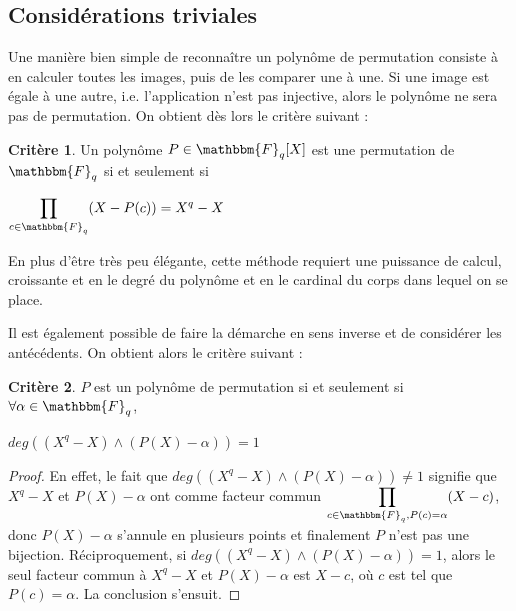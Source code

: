 \documentclass[12pt]{article}
\newcommand{\Fq}{\mathbbm{F}_q}
\theoremstyle{definition}
\newtheorem{crit}{Critère}
\begin{document}
\subsection{Considérations triviales}
Une manière bien simple de reconnaître un polynôme de permutation consiste à en calculer toutes les images, puis de les comparer une à une. Si une image est égale à une autre, i.e. l'application n'est pas injective, alors le polynôme ne sera pas de permutation. On obtient dès lors le critère suivant :
\begin{crit}
Un polynôme $P \in \Fq[X]$ est une permutation de $\Fq$ si et seulement si \begin{center}$\displaystyle\prod_{c \in \Fq}(X-P(c)) = X^q -X$ \end{center}
\end{crit}
En plus d'être très peu élégante, cette méthode requiert une puissance de calcul, croissante et en le degré du polynôme et en le cardinal du corps dans lequel on se place. 

Il est également possible de faire la démarche en sens inverse et de considérer les antécédents. On obtient alors le critère suivant :

\begin{crit}
$P$ est un polynôme de permutation si et seulement si $\forall \alpha \in \Fq$, 
\begin{center}$deg((X^q -X) \wedge (P(X)-\alpha)) = 1$\end{center}
\end{crit}

\begin{proof}
En effet, le fait que $deg((X^q -X) \wedge (P(X)-\alpha)) \neq 1$ signifie que $X^q - X$ et $P(X)-\alpha$ ont comme facteur commun $\displaystyle\prod_{c \in \Fq, P(c)=\alpha}(X-c)$, donc $P(X)-\alpha$ s'annule en plusieurs points et finalement $P$ n'est pas une bijection. \newline
Réciproquement, si $deg((X^q-X) \wedge (P(X)-\alpha))=1$, alors le seul facteur commun à $X^q-X$ et $P(X)-\alpha$ est $X-c$, où $c$ est tel que $P(c)=\alpha$. La conclusion s'ensuit.
\end{proof}
\end{document}
